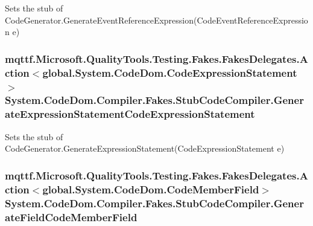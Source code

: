 Sets the stub of Code\-Generator.\-Generate\-Event\-Reference\-Expression(\-Code\-Event\-Reference\-Expression e)

\hypertarget{class_system_1_1_code_dom_1_1_compiler_1_1_fakes_1_1_stub_code_compiler_a96a9269984ca7b2610fb182781148b05}{
\subsubsection[{Generate\-Expression\-Statement\-Code\-Expression\-Statement}]{\setlength{\rightskip}{0pt plus 5cm}mqttf.\-Microsoft.\-Quality\-Tools.\-Testing.\-Fakes.\-Fakes\-Delegates.\-Action$<$global.\-System.\-Code\-Dom.\-Code\-Expression\-Statement$>$ System.\-Code\-Dom.\-Compiler.\-Fakes.\-Stub\-Code\-Compiler.\-Generate\-Expression\-Statement\-Code\-Expression\-Statement}}\label{class_system_1_1_code_dom_1_1_compiler_1_1_fakes_1_1_stub_code_compiler_a96a9269984ca7b2610fb182781148b05}


Sets the stub of Code\-Generator.\-Generate\-Expression\-Statement(\-Code\-Expression\-Statement e)

\hypertarget{class_system_1_1_code_dom_1_1_compiler_1_1_fakes_1_1_stub_code_compiler_a412c5fd5bcfff8fbdaca8c1e25b451cb}{
\subsubsection[{Generate\-Field\-Code\-Member\-Field}]{\setlength{\rightskip}{0pt plus 5cm}mqttf.\-Microsoft.\-Quality\-Tools.\-Testing.\-Fakes.\-Fakes\-Delegates.\-Action$<$global.\-System.\-Code\-Dom.\-Code\-Member\-Field$>$ System.\-Code\-Dom.\-Compiler.\-Fakes.\-Stub\-Code\-Compiler.\-Generate\-Field\-Code\-Member\-Field}}\label{class_system_1_1_code_dom_1_1_compiler_1_1_fakes_1_1_stub_code_compiler_a412c5fd5bcfff8fbdaca8c1e25b451cb}


